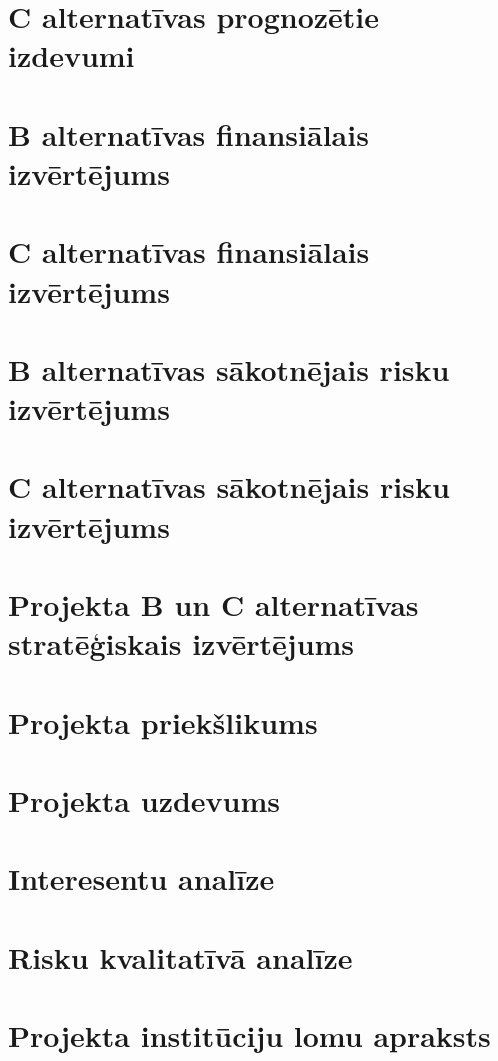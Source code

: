 \section{C alternatīvas prognozētie izdevumi}
	\label{app:C_izdevumi}
    \clearpage
\section{B alternatīvas finansiālais izvērtējums}
	\label{app:B_finansialais_vertejums}
    \clearpage
\section{C alternatīvas finansiālais izvērtējums}
	\label{app:C_finansialais_vertejums}
    \clearpage
\section{B alternatīvas sākotnējais risku izvērtējums}
	\label{app:B_sakotnejie_riski}
    \clearpage
\section{C alternatīvas sākotnējais risku izvērtējums}
	\label{app:C_sakotnejie_riski}
    \clearpage
\section{Projekta B un C alternatīvas stratēģiskais izvērtējums}
	\label{app:B_C_strategiskais_vertejums}
    \clearpage
\section{Projekta priekšlikums}
	\label{app:Projekta_priekslikums}
    \clearpage
\section{Projekta uzdevums}
	\label{app:Projekta_uzdevums}
    \clearpage
\section{Interesentu analīze}
	\label{app:Projekta_interesentu_analize}
    \clearpage
\section{Risku kvalitatīvā analīze}
	\label{app:Projekta_risku_analize}
    \clearpage
\section{Projekta institūciju lomu apraksts}
	\label{app:Projekta_instituciju_apraksts}
    \clearpage
